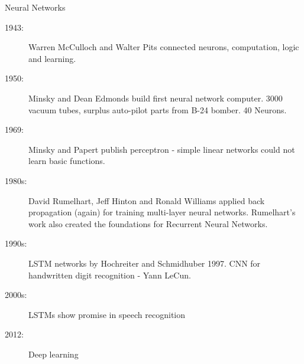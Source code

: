 \begin{frame}{Neural Networks}
	
	{\small 
	\begin{description}
		\item[1943:] Warren McCulloch and Walter Pits connected neurons, computation, logic and learning.
		\item[1950:] Minsky and Dean Edmonds build first neural network computer. 3000 vacuum tubes, surplus 
		auto-pilot parts from B-24 bomber. 40 Neurons. 
		\item[1969:] Minsky and Papert publish perceptron - simple linear networks could not learn basic 
		functions. 
		\item[1980s:] David Rumelhart, Jeff Hinton and Ronald Williams applied back propagation 
		(again) for training multi-layer neural networks. Rumelhart's work also created the foundations for 
		Recurrent Neural Networks. 
		\item[1990s:] LSTM networks by Hochreiter and Schmidhuber 1997. CNN for handwritten digit recognition - Yann LeCun. 
		\item[2000s:] LSTMs show promise in speech recognition 
		\item[2012:] Deep learning
	\end{description}
	}
\end{frame}

